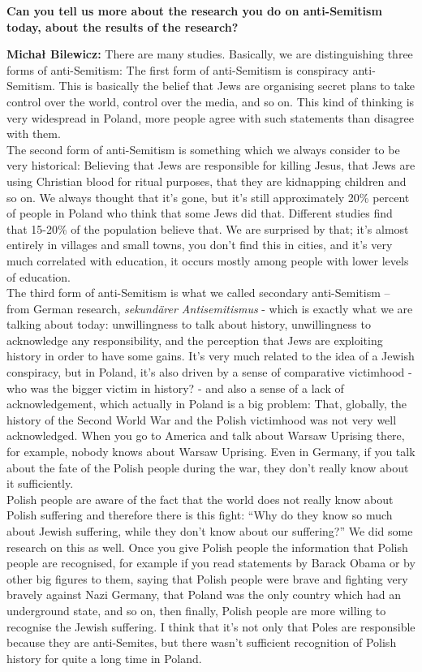 \textbf{Can you tell us more about the research you do on anti-Semitism today, about the results of the research?} 

\textbf{Michał Bilewicz:} There are many studies. Basically, we are distinguishing three forms of anti-Semitism: The first form of anti-Semitism is conspiracy anti-Semitism. This is basically the belief that Jews are organising secret plans to take control over the world, control over the media, and so on. This kind of thinking is very widespread in Poland, more people agree with such statements than disagree with them.\\
The second form of anti-Semitism is something which we always consider to be very historical: Believing that Jews are responsible for killing Jesus, that Jews are using Christian blood for ritual purposes, that they are kidnapping children and so on. We always thought that it’s gone, but it’s still approximately 20\% percent of people in Poland who think that some Jews did that. Different studies find that 15-20\% of the population believe that. We are surprised by that; it’s almost entirely in villages and small towns, you don’t find this in cities, and it’s very much correlated with education, it occurs mostly among people with lower levels of education.\\
The third form of anti-Semitism is what we called secondary anti-Semitism – from German research, \textit{sekundärer Antisemitismus} - which is exactly what we are talking about today: unwillingness to talk about history, unwillingness to acknowledge any responsibility, and the perception that Jews are exploiting history in order to have some gains. It’s very much related to the idea of a Jewish conspiracy, but in Poland, it's also driven by a sense of comparative victimhood - who was the bigger victim in history? - and also a sense of a lack of acknowledgement, which actually in Poland is a big problem: That, globally, the history of the Second World War and the Polish victimhood was not very well acknowledged. When you go to America and talk about Warsaw Uprising there, for example, nobody knows about Warsaw Uprising. Even in Germany, if you talk about the fate of the Polish people during the war, they don’t really know about it sufficiently.\\
Polish people are aware of the fact that the world does not really know about Polish suffering and therefore there is this fight: ``Why do they know so much about Jewish suffering, while they don’t know about our suffering?'' We did some research on this as well. Once you give Polish people the information that Polish people are recognised, for example if you read statements by Barack Obama or by other big figures to them, saying that Polish people were brave and fighting very bravely against Nazi Germany, that Poland was the only country which had an underground state, and so on, then finally, Polish people are more willing to recognise the Jewish suffering. I think that it's not only that Poles are responsible because they are anti-Semites, but there wasn't sufficient recognition of Polish history for quite a long time in Poland.